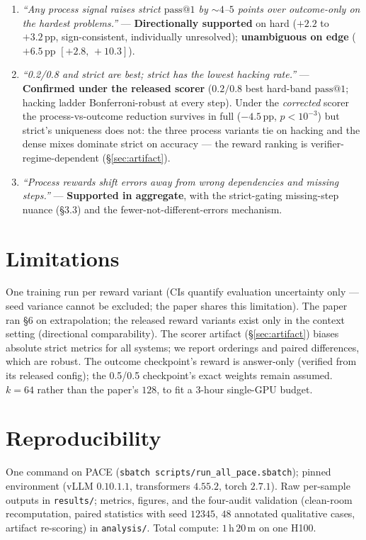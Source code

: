 \documentclass[11pt]{article}
\makeatletter
\newcommand{\passk}[1]{\ensuremath{\mathrm{pass}@#1}}
\newcommand{\pp}{\,\mathrm{pp}}
\newcommand{\ci}[2]{\ensuremath{[#1,\,#2]}}
\makeatother
\begin{document}
\begin{enumerate}[leftmargin=1.6em,itemsep=2pt]
\item \emph{``Any process signal raises strict \passk{1} by ${\sim}4$--$5$ points over
outcome-only on the hardest problems.''} --- \textbf{Directionally supported} on hard
($+2.2$ to $+3.2\pp$, sign-consistent, individually unresolved); \textbf{unambiguous on
edge} ($+6.5\pp$ \ci{+2.8}{+10.3}).
\item \emph{``0.2/0.8 and strict are best; strict has the lowest hacking rate.''} ---
\textbf{Confirmed under the released scorer} ($0.2/0.8$ best hard-band \passk{1};
hacking ladder Bonferroni-robust at every step). Under the \emph{corrected} scorer
the process-vs-outcome reduction survives in full ($-4.5\pp$, $p<10^{-3}$) but
strict's uniqueness does not: the three process variants tie on hacking and the
dense mixes dominate strict on accuracy --- the reward ranking is
verifier-regime-dependent (\S\ref{sec:artifact}).
\item \emph{``Process rewards shift errors away from wrong dependencies and missing
steps.''} --- \textbf{Supported in aggregate}, with the strict-gating missing-step
nuance (\S3.3) and the fewer-not-different-errors mechanism.
\end{enumerate}

\section{Limitations}
One training run per reward variant (CIs quantify evaluation uncertainty only ---
seed variance cannot be excluded; the paper shares this limitation). The paper ran
\S6 on extrapolation; the released reward variants exist only in the context setting
(directional comparability). The scorer artifact (\S\ref{sec:artifact}) biases
absolute strict metrics for all systems; we report orderings and paired differences,
which are robust. The outcome checkpoint's reward is answer-only (verified from its released config);
the 0.5/0.5 checkpoint's exact weights remain assumed. $k{=}64$ rather than the
paper's $128$, to fit a $3$-hour single-GPU budget.

\section{Reproducibility}
One command on PACE (\texttt{sbatch scripts/run\_all\_pace.sbatch}); pinned
environment (vLLM $0.10.1.1$, transformers $4.55.2$, torch $2.7.1$). Raw per-sample
outputs in \texttt{results/}; metrics, figures, and the four-audit validation
(clean-room recomputation, paired statistics with seed $12345$, $48$ annotated
qualitative cases, artifact re-scoring) in \texttt{analysis/}. Total compute:
$1$\,h\,$20$\,m on one H100.
\end{document}
